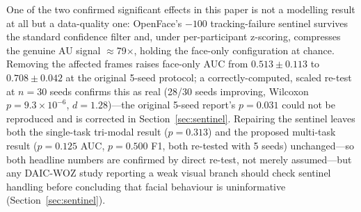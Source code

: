 \documentclass[5p,twocolumn]{elsarticle}
\begin{document}
One of the two confirmed significant effects in this paper is not a
modelling result at all but a data-quality one: OpenFace's $-100$
tracking-failure sentinel survives the standard confidence filter and,
under per-participant z-scoring, compresses the genuine AU signal
$\approx$79$\times$, holding the face-only configuration at chance.
Removing the affected frames raises face-only AUC from
$0.513\pm0.113$ to $0.708\pm0.042$ at the original 5-seed protocol; a
correctly-computed, scaled re-test at $n{=}30$ seeds confirms this as
real (28/30 seeds improving, Wilcoxon $p{=}9.3{\times}10^{-6}$,
$d{=}1.28$)---the original 5-seed report's $p{=}0.031$ could not be
reproduced and is corrected in Section~\ref{sec:sentinel}. Repairing
the sentinel leaves both the single-task
tri-modal result ($p{=}0.313$) and the proposed multi-task result
($p{=}0.125$ AUC, $p{=}0.500$ F1, both re-tested with 5 seeds)
unchanged---so both headline numbers are confirmed by direct re-test,
not merely assumed---but any DAIC-WOZ study reporting a weak visual
branch should check sentinel handling before concluding that facial
behaviour is uninformative
(Section~\ref{sec:sentinel}).
\end{document}
